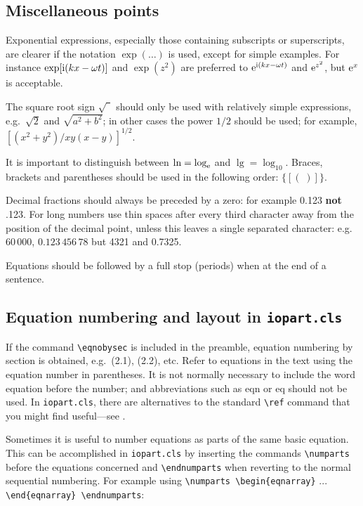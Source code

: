 \documentclass[12pt]{iopart}
\begin{document}
\subsection{Miscellaneous points}

Exponential expressions, especially those containing subscripts or
superscripts, are clearer if the notation $\exp(\ldots)$ is used, except for
simple examples. For instance $\exp[\mathrm{i}(kx-\omega t)]$ and $\exp(z^2)$ are
preferred to $\mathrm{e}^{\mathrm{i}(kx-\omega t)}$ and $\mathrm{e}^{z^2}$, but
$\mathrm{e}^x$
is acceptable.

The square root sign $\sqrt{\phantom{b}}$ should
only be used with relatively
simple expressions, e.g.\ $\sqrt2$ and $\sqrt{a^2+b^2}$;
in other cases the
power $1/2$ should be used; for example, $[(x^2+y^2)/xy(x-y)]^{1/2}$.

It is important to distinguish between $\ln = \log_{\mathrm{e}}$ and $\lg
=\log_{10}$. Braces, brackets and parentheses should be used in the
following order: $\{[(\;)]\}$.

Decimal fractions should always be preceded by a zero: for example 0.123 {\bf not} .123.
For long numbers use thin spaces after every third character away from the position of the decimal point, unless
this leaves a single separated character: e.g.\ $60\,000$, $0.123\,456\,78$
but 4321 and 0.7325.

Equations should be followed by a full stop (periods) when at the end
of a sentence.

\subsection{Equation numbering and layout in {\tt iopart.cls}}
\label{eqnum}

If the command \verb"\eqnobysec" is included in the preamble, equation
numbering by section is obtained, e.g.\ (2.1), (2.2), etc.
Refer to equations in the text using the
equation number in parentheses. It is not normally necessary to include
the word equation before the number; and abbreviations such as eqn or eq
should not be used. In \verb"iopart.cls", there are alternatives to the
standard \verb"\ref" command that you might find useful---see
.

Sometimes it is useful to number equations as parts of the same
basic equation. This can be accomplished in \verb"iopart.cls" by inserting the
commands \verb"\numparts" before the equations concerned and
\verb"\endnumparts" when reverting to the normal sequential numbering.
For example using \verb"\numparts \begin{eqnarray}" ... \verb"\end{eqnarray} \endnumparts":
\end{document}
